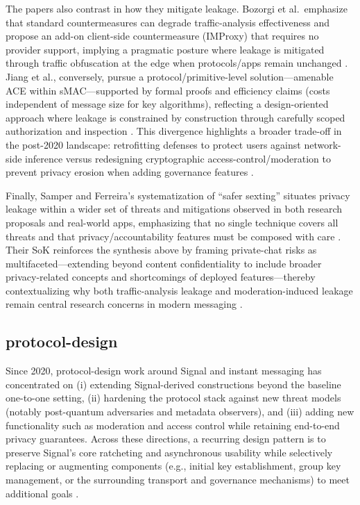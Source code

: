 The papers also contrast in how they mitigate leakage. Bozorgi et al.\ emphasize that standard countermeasures can degrade traffic-analysis effectiveness and propose an add-on client-side countermeasure (IMProxy) that requires no provider support, implying a pragmatic posture where leakage is mitigated through traffic obfuscation at the edge when protocols/apps remain unchanged \cite{bozorgi2023}. Jiang et al., conversely, pursue a protocol/primitive-level solution—amenable ACE within sMAC—supported by formal proofs and efficiency claims (costs independent of message size for key algorithms), reflecting a design-oriented approach where leakage is constrained by construction through carefully scoped authorization and inspection \cite{jiang2024}. This divergence highlights a broader trade-off in the post-2020 landscape: retrofitting defenses to protect users against network-side inference versus redesigning cryptographic access-control/moderation to prevent privacy erosion when adding governance features \cite{bozorgi2023,jiang2024}.

Finally, Samper and Ferreira’s systematization of “safer sexting” situates privacy leakage within a wider set of threats and mitigations observed in both research proposals and real-world apps, emphasizing that no single technique covers all threats and that privacy/accountability features must be composed with care \cite{samper2025}. Their SoK reinforces the synthesis above by framing private-chat risks as multifaceted—extending beyond content confidentiality to include broader privacy-related concepts and shortcomings of deployed features—thereby contextualizing why both traffic-analysis leakage and moderation-induced leakage remain central research concerns in modern messaging \cite{samper2025}.

\subsection{protocol-design}
Since 2020, protocol-design work around Signal and instant messaging has concentrated on (i) extending Signal-derived constructions beyond the baseline one-to-one setting, (ii) hardening the protocol stack against new threat models (notably post-quantum adversaries and metadata observers), and (iii) adding new functionality such as moderation and access control while retaining end-to-end privacy guarantees. Across these directions, a recurring design pattern is to preserve Signal’s core ratcheting and asynchronous usability while selectively replacing or augmenting components (e.g., initial key establishment, group key management, or the surrounding transport and governance mechanisms) to meet additional goals \cite{basem2023,nelson2024,angom2025,ayed2025,bobrysheva2021,jiang2024}.

